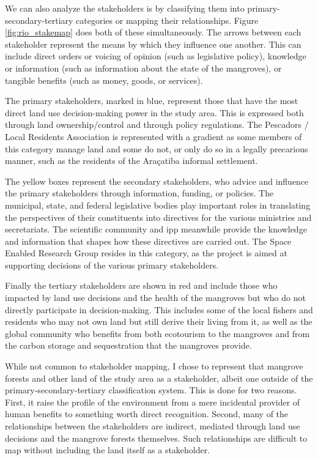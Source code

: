 We can also analyze the stakeholders is by classifying them into primary-secondary-tertiary categories or mapping their relationships. Figure \ref{fig:rio_stakemap} does both of these simultaneously. The arrows between each stakeholder represent the means by which they influence one another. This can include direct orders or voicing of opinion (such as legislative policy), knowledge or information (such as information about the state of the mangroves), or tangible benefits (such as money, goods, or services).

The primary stakeholders, marked in blue, represent those that have the most direct land use decision-making power in the study area. This is expressed both through land ownership/control and through policy regulations. The Pescadors / Local Residents Association is represented with a gradient as some members of this category manage land and some do not, or only do so in a legally precarious manner, such as the residents of the Araçatiba informal settlement. 

The yellow boxes represent the secondary stakeholders, who advice and influence the primary stakeholders through information, funding, or policies. The municipal, state, and federal legislative bodies play important roles in translating the perspectives of their constituents into directives for the various ministries and secretariats. The scientific community and \ac{ipp} meanwhile provide the knowledge and information that shapes how these directives are carried out. The Space Enabled Research Group resides in this category, as the project is aimed at supporting decisions of the various primary stakeholders. 

Finally the tertiary stakeholders are shown in red and include those who impacted by land use decisions and the health of the mangroves but who do not directly participate in decision-making. This includes some of the local fishers and residents who may not own land but still derive their living from it, as well as the global community who benefits from both ecotourism to the mangroves and from the carbon storage and sequestration that the mangroves provide.

While not common to stakeholder mapping, I chose to represent that mangrove forests and other land of the study area as a stakeholder, albeit one outside of the primary-secondary-tertiary classification system. This is done for two reasons. First, it raise the profile of the environment from a mere incidental provider of human benefits to something worth direct recognition. Second, many of the relationships between the stakeholders are indirect, mediated through land use decisions and the mangrove forests themselves. Such relationships are difficult to map without including the land itself as a stakeholder.

